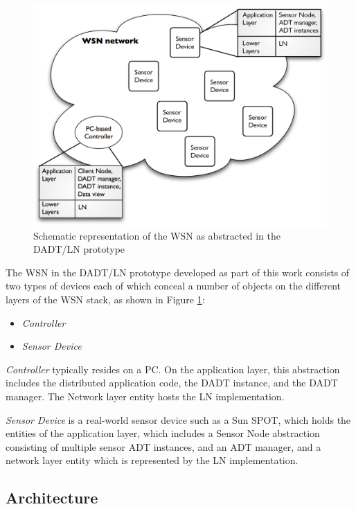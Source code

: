 \begin{figure}
\centering
\includegraphics[scale=0.55]{img/DADTLN_glossary.eps} 
\caption[WSN in DADT/LN prototype]{Schematic representation of the WSN as
abstracted in the DADT/LN prototype}
\label{Fig:DADTLN_glossary}
\end{figure} 

The WSN in the DADT/LN prototype developed as part of
this work consists of two types of devices each of which conceal a number
of objects on the different layers of the WSN stack, as shown in Figure
\ref{Fig:DADTLN_glossary}:
\begin{itemize}
  \item \emph{Controller}
  \item \emph{Sensor Device}
\end{itemize}  
   
\emph{Controller} typically resides on a PC. On the application layer, this
abstraction includes the distributed application code, the DADT
instance, and the DADT manager. The Network layer entity hosts the LN implementation.
  
\emph{Sensor Device} is a real-world sensor device such as a Sun SPOT, 
which holds the entities of the application layer, which includes a Sensor Node
abstraction consisting of multiple sensor ADT instances, and an ADT
manager, and a network layer entity which is represented by the LN implementation.

\subsection{Architecture}

